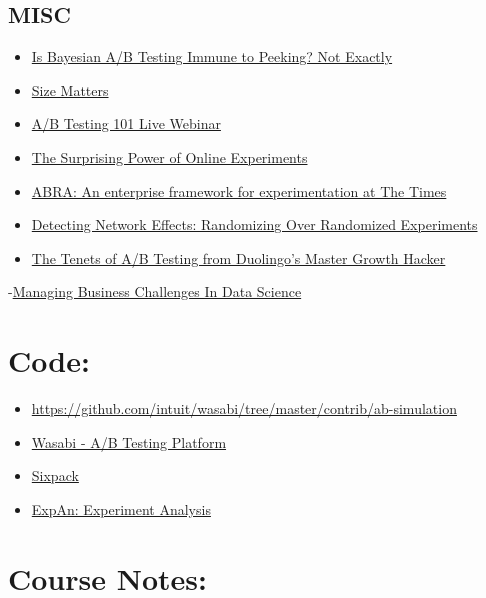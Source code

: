 \documentclass[]{book}
\theoremstyle{definition}
\theoremstyle{definition}
\theoremstyle{definition}
\theoremstyle{remark}
\begin{document}
\subsection{MISC}\label{misc}

\begin{itemize}
\item
  \href{http://varianceexplained.org/r/bayesian-ab-testing/}{Is Bayesian
  A/B Testing Immune to Peeking? Not Exactly}
\item
  \href{http://rex-analytics.com/size-matters/}{Size Matters}
\item
  \href{https://www.youtube.com/watch?v=Had65TUj3gg\&t}{A/B Testing 101
  Live Webinar}
\item
  \href{https://hbr.org/2017/09/the-surprising-power-of-online-experiments}{The
  Surprising Power of Online Experiments}
\item
  \href{https://open.nytimes.com/abra-an-enterprise-framework-for-experimentation-at-the-times-57f8931449cd}{ABRA:
  An enterprise framework for experimentation at The Times}
\item
  \href{https://www.youtube.com/watch?v=1v5_CzdRVAc\&feature=youtu.be}{Detecting
  Network Effects: Randomizing Over Randomized Experiments}
\item
  \href{http://firstround.com/review/the-tenets-of-a-b-testing-from-duolingos-master-growth-hacker/}{The
  Tenets of A/B Testing from Duolingo's Master Growth Hacker}
\end{itemize}

-\href{https://robinsones.github.io/Managing-Business-Challenges-in-Data-Science/}{Managing
Business Challenges In Data Science}

\section{Code:}\label{code}

\begin{itemize}
\item
  \url{https://github.com/intuit/wasabi/tree/master/contrib/ab-simulation}
\item
  \href{https://github.com/intuit/wasabi/tree/master}{Wasabi - A/B
  Testing Platform}
\item
  \href{https://github.com/seatgeek/sixpack}{Sixpack}
\item
  \href{https://github.com/zalando/expan}{ExpAn: Experiment Analysis}
\end{itemize}

\section{Course Notes:}\label{course-notes}
\end{document}
